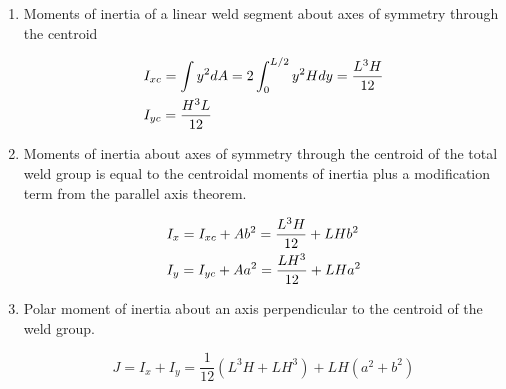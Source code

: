 \documentclass[
10pt,
a4paper,
openany,
svgnames,
]{book}
\begin{document}
\begin{enumerate}
\item Moments of inertia of a linear weld segment about axes of symmetry through the centroid

  \begin{equation}
    \begin{gathered}
        I_{xc} = \int y^2dA  = 2\int_0^{L/2} y^2Hdy  = \frac{L^3H}{12} \hfill \\
        {I_{yc}} = \frac{H^3L}{12} \hfill \\ 
      \end{gathered}
  \end{equation}
\item Moments of inertia about axes of symmetry through the centroid of the total weld group is equal to the centroidal moments of inertia plus a modification term from the parallel axis theorem.

  \begin{equation}
    \begin{gathered} \label{eqn: weld group moment of inertia}
      I_x = I_{xc} + Ab^2 = \frac{L^3H}{12} + LHb^2 \hfill \\
      I_y = I_{yc} + Aa^2 = \frac{LH^3}{12} + LHa^2 \hfill 
    \end{gathered}
  \end{equation}
\item Polar moment of inertia about an axis perpendicular to the centroid of the weld group.

  \begin{equation}
    J = I_x + I_y = \frac{1}{12}(L^3H + LH^3) + LH(a^2 + b^2)
  \end{equation}
\end{enumerate}
\end{document}
